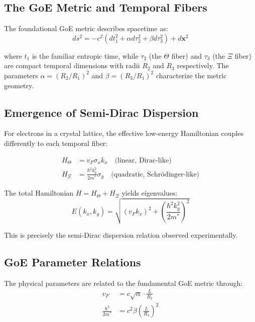 \documentclass[12pt,a4paper]{article}
\begin{document}
\subsection{The GoE Metric and Temporal Fibers}

The foundational GoE metric describes spacetime as:
\begin{equation}
ds^2 = -c^2(dt_1^2 + \alpha d\tau_2^2 + \beta d\tau_3^2) + d\mathbf{x}^2
\label{eq:goe_metric}
\end{equation}

where $t_1$ is the familiar entropic time, while $\tau_2$ (the $\Theta$ fiber) and $\tau_3$ (the $\Xi$ fiber) are compact temporal dimensions with radii $R_2$ and $R_3$ respectively. The parameters $\alpha = (R_2/R_1)^2$ and $\beta = (R_3/R_1)^2$ characterize the metric geometry.

\subsection{Emergence of Semi-Dirac Dispersion}

For electrons in a crystal lattice, the effective low-energy Hamiltonian couples differently to each temporal fiber:

\begin{align}
H_{\Theta} &= v_F \sigma_x k_x \quad \text{(linear, Dirac-like)}\\
H_{\Xi} &= \frac{\hbar^2 k_y^2}{2m^*} \sigma_y \quad \text{(quadratic, Schrödinger-like)}
\end{align}

The total Hamiltonian $H = H_{\Theta} + H_{\Xi}$ yields eigenvalues:
\begin{equation}
E(k_x, k_y) = \sqrt{(v_F k_x)^2 + \left(\frac{\hbar^2 k_y^2}{2m^*}\right)^2}
\label{eq:semi_dirac}
\end{equation}

This is precisely the semi-Dirac dispersion relation observed experimentally.

\subsection{GoE Parameter Relations}

The physical parameters are related to the fundamental GoE metric through:
\begin{align}
v_F &= c\sqrt{\alpha} \cdot \frac{L}{R_2}\\
\frac{\hbar^2}{2m^*} &= c^2\beta \left(\frac{L}{R_3}\right)^2
\end{align}
\end{document}
